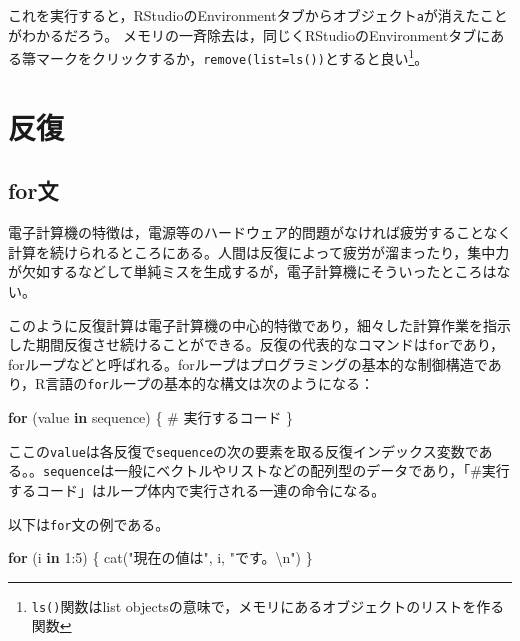 \documentclass[
  a4paper,
]{ltjsbook}
\newenvironment{Shaded}{\begin{snugshade}}{\end{snugshade}}
\newcommand{\CommentTok}[1]{\textcolor[rgb]{0.37,0.37,0.37}{#1}}
\newcommand{\ControlFlowTok}[1]{\textcolor[rgb]{0.00,0.23,0.31}{\textbf{#1}}}
\newcommand{\DecValTok}[1]{\textcolor[rgb]{0.68,0.00,0.00}{#1}}
\newcommand{\FunctionTok}[1]{\textcolor[rgb]{0.28,0.35,0.67}{#1}}
\newcommand{\NormalTok}[1]{\textcolor[rgb]{0.00,0.23,0.31}{#1}}
\newcommand{\SpecialCharTok}[1]{\textcolor[rgb]{0.37,0.37,0.37}{#1}}
\newcommand{\StringTok}[1]{\textcolor[rgb]{0.13,0.47,0.30}{#1}}
\begin{document}
これを実行すると，RStudioのEnvironmentタブからオブジェクト\texttt{a}が消えたことがわかるだろう。
メモリの一斉除去は，同じくRStudioのEnvironmentタブにある箒マークをクリックするか，\texttt{remove(list=ls())}とすると良い\footnote{\texttt{ls()}関数はlist
  objectsの意味で，メモリにあるオブジェクトのリストを作る関数}。

\section{反復}\label{ux53cdux5fa9}

\subsection{for文}\label{forux6587}

電子計算機の特徴は，電源等のハードウェア的問題がなければ疲労することなく計算を続けられるところにある。人間は反復によって疲労が溜まったり，集中力が欠如するなどして単純ミスを生成するが，電子計算機にそういったところはない。

このように反復計算は電子計算機の中心的特徴であり，細々した計算作業を指示した期間反復させ続けることができる。反復の代表的なコマンドは\texttt{for}であり，forループなどと呼ばれる。forループはプログラミングの基本的な制御構造であり，R言語の\texttt{for}ループの基本的な構文は次のようになる：

\begin{Shaded}
\begin{Highlighting}[]
\ControlFlowTok{for}\NormalTok{ (value }\ControlFlowTok{in}\NormalTok{ sequence) \{}
    \CommentTok{\# 実行するコード}
\NormalTok{\}}
\end{Highlighting}
\end{Shaded}

ここの\texttt{value}は各反復で\texttt{sequence}の次の要素を取る反復インデックス変数である。。\texttt{sequence}は一般にベクトルやリストなどの配列型のデータであり，「\#実行するコード」はループ体内で実行される一連の命令になる。

以下は\texttt{for}文の例である。

\begin{Shaded}
\begin{Highlighting}[]
\ControlFlowTok{for}\NormalTok{ (i }\ControlFlowTok{in} \DecValTok{1}\SpecialCharTok{:}\DecValTok{5}\NormalTok{) \{}
  \FunctionTok{cat}\NormalTok{(}\StringTok{"現在の値は"}\NormalTok{, i, }\StringTok{"です。}\SpecialCharTok{\textbackslash{}n}\StringTok{"}\NormalTok{)}
\NormalTok{\}}
\end{Highlighting}
\end{Shaded}
\end{document}
